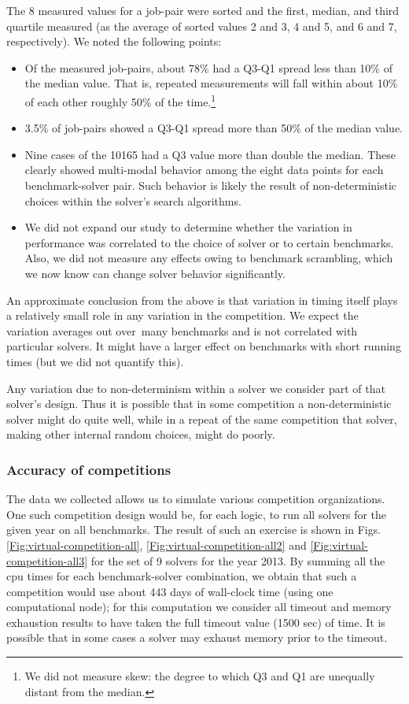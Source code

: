 \documentclass{eptcs}
\begin{document}
The 8 measured values for a job-pair were sorted and the first, median, and third quartile measured (as the average of sorted values 2 and 3, 4 and 5, and 6 and 7, respectively). We noted the following points:
\begin{itemize}[noitemsep,nolistsep]
\item Of the measured job-pairs, about 78\% had a Q3-Q1 spread less than 10\% of the median value. That is, repeated measurements will fall within about 10\% of each other roughly 50\% of the time.\footnote{We did not measure skew: the degree to which Q3 and Q1 are unequally distant from the median.}
\item 3.5\% of job-pairs showed a Q3-Q1 spread more than 50\% of the median value. 
\item Nine cases of the 10165 had a Q3 value more than double the median. These clearly showed multi-modal behavior among the eight data points for each benchmark-solver pair. Such behavior is likely the result of non-deterministic choices within the solver's search algorithms. 
\item We did not expand our study to determine whether the variation in performance was correlated to the choice of solver or to certain benchmarks. Also, we did not measure any effects owing to benchmark scrambling, which we now know can change solver behavior significantly.
\end{itemize}

An approximate conclusion from the above is that variation in timing itself plays a relatively small role in any variation in the competition. We expect the variation averages out over\ many benchmarks and is not correlated with particular solvers. It might have a larger effect on benchmarks with short running times (but we did not quantify this).

Any variation due to non-determinism within a solver we consider part of that solver's design. Thus it is possible that in some competition a non-deterministic solver might do quite well, while in a repeat of the same competition that solver, making other internal random choices, might do poorly. 

\subsubsection{Accuracy of competitions}
\label{BenchmarkSelection}
The data we collected allows us to simulate various competition organizations. One such competition design would be, for each logic, to run all solvers for the given year on all benchmarks. The result of such an exercise is shown in Figs. \ref{Fig:virtual-competition-all}, \ref{Fig:virtual-competition-all2} and \ref{Fig:virtual-competition-all3} for the set of 9 solvers for the year 2013. By summing all the cpu times for each benchmark-solver combination, we obtain that such a competition would use about 443 days of wall-clock time (using one computational node); for this computation we consider all timeout and memory exhaustion results to have taken the full timeout value (1500 sec) of time. It is possible that in some cases a solver may exhaust memory prior to the timeout.
\end{document}
